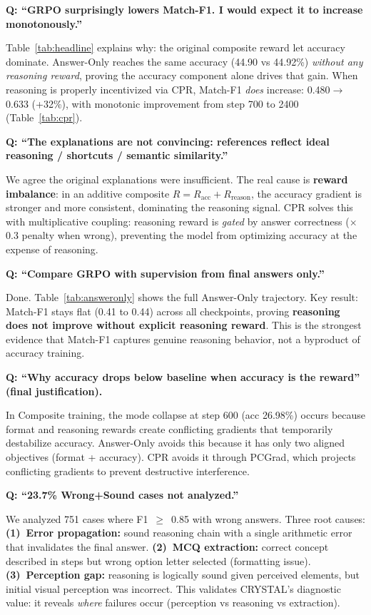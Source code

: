 \documentclass[10pt,twocolumn,letterpaper]{article}
\begin{document}
\noindent\textbf{Q: ``GRPO surprisingly lowers Match-F1. I would expect it to increase monotonously.''}

Table~\ref{tab:headline} explains why: the original composite reward let accuracy dominate. Answer-Only reaches the same accuracy (44.90 vs 44.92\%) \textit{without any reasoning reward}, proving the accuracy component alone drives that gain. When reasoning is properly incentivized via CPR, Match-F1 \textit{does} increase: 0.480$\to$0.633 (+32\%), with monotonic improvement from step 700 to 2400 (Table~\ref{tab:cpr}).

\noindent\textbf{Q: ``The explanations are not convincing: references reflect ideal reasoning / shortcuts / semantic similarity.''}

We agree the original explanations were insufficient. The real cause is \textbf{reward imbalance}: in an additive composite $R = R_{\text{acc}} + R_{\text{reason}}$, the accuracy gradient is stronger and more consistent, dominating the reasoning signal. CPR solves this with multiplicative coupling: reasoning reward is \textit{gated} by answer correctness ($\times$0.3 penalty when wrong), preventing the model from optimizing accuracy at the expense of reasoning.

\noindent\textbf{Q: ``Compare GRPO with supervision from final answers only.''}

Done. Table~\ref{tab:answeronly} shows the full Answer-Only trajectory. Key result: Match-F1 stays flat (0.41 to 0.44) across all checkpoints, proving \textbf{reasoning does not improve without explicit reasoning reward}. This is the strongest evidence that Match-F1 captures genuine reasoning behavior, not a byproduct of accuracy training.

\noindent\textbf{Q: ``Why accuracy drops below baseline when accuracy is the reward'' (final justification).}

In Composite training, the mode collapse at step 600 (acc 26.98\%) occurs because format and reasoning rewards create conflicting gradients that temporarily destabilize accuracy. Answer-Only avoids this because it has only two aligned objectives (format + accuracy). CPR avoids it through PCGrad, which projects conflicting gradients to prevent destructive interference.

\noindent\textbf{Q: ``23.7\% Wrong+Sound cases not analyzed.''}

We analyzed 751 cases where F1~$\geq$~0.85 with wrong answers. Three root causes: \textbf{(1)~Error propagation:} sound reasoning chain with a single arithmetic error that invalidates the final answer. \textbf{(2)~MCQ extraction:} correct concept described in steps but wrong option letter selected (formatting issue). \textbf{(3)~Perception gap:} reasoning is logically sound given perceived elements, but initial visual perception was incorrect. This validates CRYSTAL's diagnostic value: it reveals \textit{where} failures occur (perception vs reasoning vs extraction).
\end{document}
